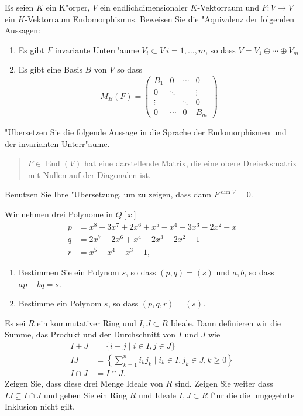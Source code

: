 \documentclass[a4,11pt]{article}
\DeclareMathOperator{\End}{End}
\begin{document}
\begin{aufgabe}
Es seien $K$ ein K"orper, $V$ ein endlichdimensionaler $K$-Vektorraum und $F : V \rightarrow V$ ein $K$-Vektorraum Endomorphismus. Beweisen Sie die "Aquivalenz der folgenden Aussagen:


\begin{enumerate}
\item Es gibt $F$ invariante Unterr"aume $V_i \subset V \ i= 1,\dots , m$, so dass $V = V_1 \oplus \cdots \oplus V_m$
\item Es gibt eine Basis $B$ von $V$ so dass 
\[
M_B(F) = \begin{pmatrix}B_1 & 0 & \cdots& 0\\
0& \ddots & & \vdots \\
\vdots & & \ddots& 0 \\
0 & \cdots & 0 & B_m
\end{pmatrix}
\]
\end{enumerate}
\end{aufgabe}

\begin{aufgabe}
  "Ubersetzen Sie die folgende Aussage in die Sprache der
  Endomorphismen und der invarianten Unterr"aume.
  \begin{quotation}
    $F \in \End(V)$ hat eine darstellende Matrix, die eine obere
    Dreiecksmatrix mit Nullen auf der Diagonalen ist.
  \end{quotation}

  Benutzen Sie Ihre "Ubersetzung, um zu zeigen, dass dann $F^{\dim V}
  = 0$.
\end{aufgabe}

\begin{aufgabe}
Wir nehmen drei Polynome in $Q[x]$
\begin{align*}
p &= x^8 + 3x^7 + 2x^6 + x^5 - x^4 - 3x^3 - 2x^2 - x\\
q &= 2x^7 + 2x^6 + x^4 - 2x^3 - 2x^2 - 1\\
r &= x^5 + x^4 - x^3 - 1,
\end{align*}
\begin{enumerate}
\item
  Bestimmen Sie ein Polynom $s$, so dass $(p,q) = (s)$
  und $a,b$, so dass $ap+bq=s$.
\item
  Bestimme ein Polynom $s$, so dass $(p,q,r) = (s)$.
 \end{enumerate}
\end{aufgabe}

\begin{aufgabe}

Es sei $R$ ein kommutativer Ring und $I, J \subset R$ Ideale. Dann definieren wir die Summe, das Produkt und der Durchschnitt von $I$ und $J$ wie
\begin{align*}
I + J &= \{ i + j \mid i \in I, j \in J \}\\
IJ &= \left\{ \sum_{k = 1}^n i_k j_k \mid i_k \in I, j_k \in J, k \geq 0 \right\}\\
I \cap J &= I \cap J.
\end{align*}
Zeigen Sie, dass diese drei Menge Ideale von $R$ sind. Zeigen Sie weiter dass $IJ \subseteq I \cap J$ und geben Sie ein Ring $R$ und Ideale $I, J \subset R$ f"ur die die umgegehrte Inklusion nicht gilt.  
\end{aufgabe}
\end{document}
